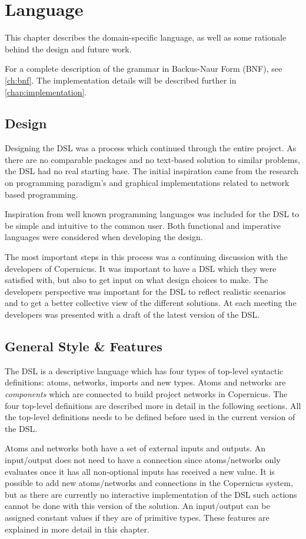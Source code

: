 \chapter{Language}\label{chap:language}
This chapter describes the domain-specific language, as well as some
rationale behind the design and future work.

For a complete description of the grammar in Backus-Naur Form (BNF),
see \autoref{ch:bnf}. The implementation details will be described
further in \autoref{chap:implementation}.


\section{Design}
Designing the DSL was a process which continued through the entire
project. As there are no comparable packages and no text-based
solution to similar problems, the DSL had no real starting base. The
initial inspiration came from the research on programming paradigm's
and graphical implementations related to network based programming.

Inspiration from well known programming languages was included for the
DSL to be simple and intuitive to the common user. Both functional and
imperative languages were considered when developing the design.

The most important steps in this process was a continuing discussion
with the developers of Copernicus. It was important to have a DSL
which they were satisfied with, but also to get input on what design
choices to make. The developers perspective was important for the DSL
to reflect realistic scenarios and to get a better collective view of
the different solutions. At each meeting the developers was presented
with a draft of the latest version of the DSL.


\section{General Style \& Features}
The DSL is a descriptive language which has four types of top-level
syntactic definitions: atoms, networks, imports and new types. Atoms
and networks are \emph{components} which are connected to build
project networks in Copernicus. The four top-level definitions are
described more in detail in the following sections. All the top-level
definitions needs to be defined before used in the current version of
the DSL.

Atoms and networks both have a set of external inputs and outputs. An
input/output does not need to have a connection since atoms/networks
only evaluates once it has all non-optional inputs has received a new
value. It is possible to add new atoms/networks and connections in the
Copernicus system, but as there are currently no interactive
implementation of the DSL such actions cannot be done with this
version of the solution. An input/output can be assigned constant
values if they are of primitive types. These features are explained in
more detail in this chapter.


